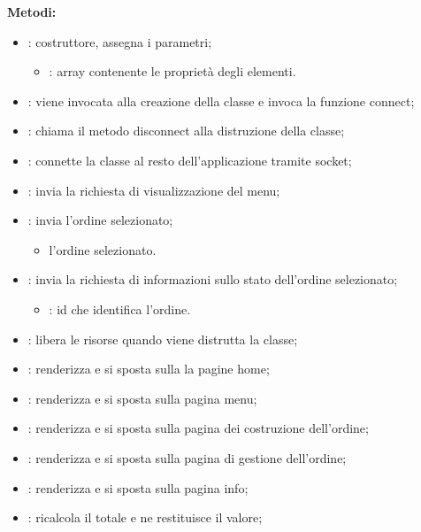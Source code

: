 \textbf{Metodi:}
\begin{itemize}
	\item {}: costruttore, assegna i parametri;
		\begin{itemize}
			\item {}: array contenente le proprietà degli elementi.
		\end{itemize}
	\item {}: viene invocata alla creazione della classe e invoca la funzione connect;
	\item {}: chiama il metodo disconnect alla distruzione della classe;
	\item {}: connette la classe al resto dell'applicazione tramite socket;
	\item {}: invia la richiesta di visualizzazione del menu;
	\item {}: invia l'ordine selezionato;
		\begin{itemize}
			\item {} l'ordine selezionato.
		\end{itemize}
	\item {}: invia la richiesta di informazioni sullo stato dell'ordine selezionato;
		\begin{itemize}
			\item {}: id che identifica l'ordine.
		\end{itemize}
	\item {}: libera le risorse quando viene distrutta la classe;
	\item {}: renderizza e si sposta sulla la pagine home;
	\item {}: renderizza e si sposta sulla pagina menu;
	\item {}: renderizza e si sposta sulla pagina dei costruzione dell'ordine;
	\item {}: renderizza e si sposta sulla pagina di gestione dell'ordine; 
	\item {}: renderizza e si sposta sulla pagina info;
	\item {}: ricalcola il totale e ne restituisce il valore;

\end{itemize}
